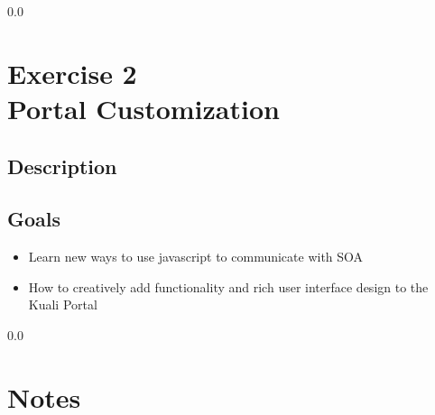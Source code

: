 {\setlength{\baselineskip}%
  {0.0\baselineskip}
  \section*{\flushright Exercise 2\\Portal Customization}
  \hrulefill \par}

\subsection*{Description}

\subsection*{Goals}
\begin{itemize}
  \item Learn new ways to use javascript to communicate with SOA 
  \item How to creatively add functionality and rich user interface
    design to the Kuali Portal
\end{itemize}


\newpage
  {\setlength{\baselineskip}%
           {0.0\baselineskip}
  \section*{Notes}
  \hrulefill \par}


